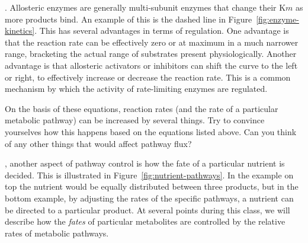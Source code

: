 \documentclass{tufte-handout}
\begin{document}
.  Allosteric enzymes are generally multi-subunit enzymes that change their K${m}$ as more products bind.  An example of this is the dashed line in Figure~\ref{fig:enzyme-kinetics}.  This has several advantages in terms of regulation.  One advantage is that the reaction rate can be effectively zero or at maximum in a much narrower range, bracketing the actual range of substrates present physiologically.  Another advantage is that allosteric activators or inhibitors can shift the curve to the left or right, to effectively increase or decrease the reaction rate.  This is a common mechanism by which the activity of rate-limiting enzymes are regulated.  

On the basis of these equations, reaction rates (and the rate of a particular metabolic pathway) can be increased by several things.  Try to convince yourselves how this happens based on the equations listed above. Can you think of any other things that would affect pathway flux? 

, another aspect of pathway control is how the fate of a particular nutrient is decided.  This is illustrated in Figure~\ref{fig:nutrient-pathways}.  In the example on top the nutrient would be equally distributed between three products, but in the bottom example, by adjusting the rates of the specific pathways, a nutrient can be directed to a particular product.  At several points during this class, we will describe how the \emph{fates} of particular metabolites are controlled by the relative rates of metabolic pathways.
\end{document}
